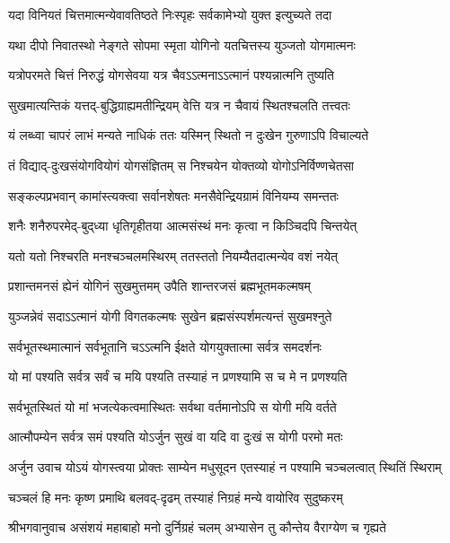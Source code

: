 \twolineshloka
{यदा विनियतं चित्तमात्मन्येवावतिष्ठते}
{निःस्पृहः सर्वकामेभ्यो युक्त इत्युच्यते तदा}%

\twolineshloka
{यथा दीपो निवातस्थो नेङ्गते सोपमा स्मृता}
{योगिनो यतचित्तस्य युञ्जतो योगमात्मनः}%

\twolineshloka
{यत्रोपरमते चित्तं निरुद्धं योगसेवया}
{यत्र चैवऽऽत्मनाऽऽत्मानं पश्यन्नात्मनि तुष्यति}%

\twolineshloka
{सुखमात्यन्तिकं यत्तद्-बुद्धिग्राह्यमतीन्द्रियम्}
{वेत्ति यत्र न चैवायं स्थितश्चलति तत्त्वतः}%

\twolineshloka
{यं लब्ध्वा चापरं लाभं मन्यते नाधिकं ततः}
{यस्मिन् स्थितो न दुःखेन गुरुणाऽपि विचाल्यते}%

\twolineshloka
{तं विद्याद्-दुःखसंयोगवियोगं योगसंज्ञितम्}
{स निश्चयेन योक्तव्यो योगोऽनिर्विण्णचेतसा}%

\twolineshloka
{सङ्कल्पप्रभवान् कामांस्त्यक्त्वा सर्वानशेषतः}
{मनसैवेन्द्रियग्रामं विनियम्य समन्ततः}%

\twolineshloka
{शनैः शनैरुपरमेद्-बुद्‌ध्या धृतिगृहीतया}
{आत्मसंस्थं मनः कृत्वा न किञ्चिदपि चिन्तयेत्}%

\twolineshloka
{यतो यतो निश्चरति मनश्चञ्चलमस्थिरम्}
{ततस्ततो नियम्यैतदात्मन्येव वशं नयेत्}%

\twolineshloka
{प्रशान्तमनसं ह्येनं योगिनं सुखमुत्तमम्}
{उपैति शान्तरजसं ब्रह्मभूतमकल्मषम्}%

\twolineshloka
{युञ्जन्नेवं सदाऽऽत्मानं योगी विगतकल्मषः}
{सुखेन ब्रह्मसंस्पर्शमत्यन्तं सुखमश्नुते}%

\twolineshloka
{सर्वभूतस्थमात्मानं सर्वभूतानि चऽऽत्मनि}
{ईक्षते योगयुक्तात्मा सर्वत्र समदर्शनः}%

\twolineshloka
{यो मां पश्यति सर्वत्र सर्वं च मयि पश्यति}
{तस्याहं न प्रणश्यामि स च मे न प्रणश्यति}%

\twolineshloka
{सर्वभूतस्थितं यो मां भजत्येकत्वमास्थितः}
{सर्वथा वर्तमानोऽपि स योगी मयि वर्तते}%

\twolineshloka
{आत्मौपम्येन सर्वत्र समं पश्यति योऽर्जुन}
{सुखं वा यदि वा दुःखं स योगी परमो मतः}%

{अर्जुन उवाच}
\twolineshloka
{योऽयं योगस्त्वया प्रोक्तः साम्येन मधुसूदन}
{एतस्याहं न पश्यामि चञ्चलत्वात् स्थितिं स्थिराम्}%

\twolineshloka
{चञ्चलं हि मनः कृष्ण प्रमाथि बलवद्-दृढम्}
{तस्याहं निग्रहं मन्ये वायोरिव सुदुष्करम्}%

{श्रीभगवानुवाच}
\twolineshloka
{असंशयं महाबाहो मनो दुर्निग्रहं चलम्}
{अभ्यासेन तु कौन्तेय वैराग्येण च गृह्यते}%

